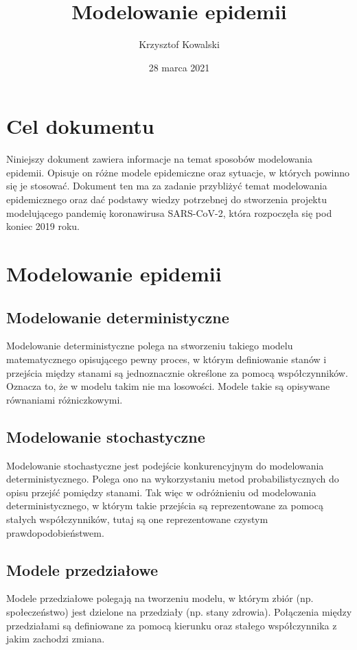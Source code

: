 \documentclass[12pt,a4paper]{article}
\title{Modelowanie epidemii}
\author{Krzysztof Kowalski}
\date{28 marca 2021}
\begin{document}
\maketitle
\thispagestyle{empty}
\newpage
\pagestyle{fancy}
\fancyhf{}
\tableofcontents
\newpage

\section{Cel dokumentu}
Niniejszy dokument zawiera informacje na temat sposobów modelowania epidemii. Opisuje on różne modele epidemiczne oraz sytuacje, w których powinno się je stosować. Dokument ten ma za zadanie przybliżyć temat modelowania epidemicznego oraz dać podstawy wiedzy potrzebnej do stworzenia projektu modelującego pandemię koronawirusa SARS-CoV-2, która rozpoczęła się pod koniec 2019 roku. 

\section{Modelowanie epidemii}
\subsection{Modelowanie deterministyczne}
Modelowanie deterministyczne polega na stworzeniu takiego modelu matematycznego opisującego pewny proces, w którym definiowanie stanów i przejścia między stanami są jednoznacznie określone za pomocą współczynników. Oznacza to, że w modelu takim nie ma losowości. Modele takie są opisywane równaniami różniczkowymi.

\subsection{Modelowanie stochastyczne}
Modelowanie stochastyczne jest podejście konkurencyjnym do modelowania deterministycznego. Polega ono na wykorzystaniu metod probabilistycznych do opisu przejść pomiędzy stanami. Tak więc w odróżnieniu od modelowania deterministycznego, w którym takie przejścia są reprezentowane za pomocą stałych współczynników, tutaj są one reprezentowane czystym prawdopodobieństwem. 

\subsection{Modele przedziałowe}
Modele przedziałowe polegają na tworzeniu modelu, w którym zbiór (np. społeczeństwo) jest dzielone na przedziały (np. stany zdrowia). Połączenia między przedziałami są definiowane za pomocą kierunku oraz stałego współczynnika z jakim zachodzi zmiana. 
\end{document}
